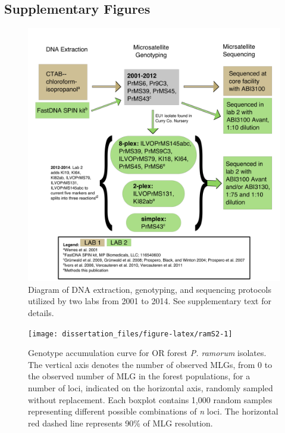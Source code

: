 \documentclass[double,11pt]{beavtex}
\begin{document}
  \subsection{Supplementary Figures}\label{supplementary-figures}
  
  \begin{figure}
  
  {\centering \includegraphics[width=1\linewidth]{figure/phytopathology/figureS1} 
  
  }
  
  \caption[Diagram of DNA extraction, genotyping, and sequencing protocols 
  utilized by two labs from 2001 to 2014.]{Diagram of DNA extraction, genotyping, and sequencing protocols 
  utilized by two labs from 2001 to 2014. See supplementary text for details.}\label{fig:ramS1}
  \end{figure}
  
  \begin{figure}
  
  {\centering \texttt{[image: dissertation\_files/figure-latex/ramS2-1]} 
  
  }
  
  \caption[Genotype accumulation curve for OR forest \emph{P. ramorum} isolates.]{Genotype accumulation curve for OR forest \emph{P. ramorum} isolates.
  The vertical axis denotes the number of observed MLGs, from 0 to the
  observed number of MLG in the forest populations, for a number of loci,
  indicated on the horizontal axis, randomly sampled without replacement.
  Each boxplot contains 1,000 random samples representing different
  possible combinations of \emph{n} loci. The horizontal red dashed line
  represents 90\% of MLG resolution.}\label{fig:ramS2}
  \end{figure}
  
\end{document}
